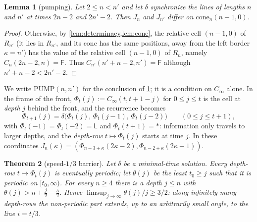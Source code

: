 \documentclass[3p]{elsarticle}
\newtheorem{theorem}{Theorem}[section]
\newtheorem{lemma}[theorem]{Lemma}
\theoremstyle{definition}
\newcommand{\Lq}{\mathsf L}
\newcommand{\Fq}{\mathsf F}
\begin{document}
\begin{lemma}[pumping]\label{lem:pumping}
Let $2\le n<n'$ and let $\delta$ synchronize the lines of lengths $n$ and $n'$
at times $2n-2$ and $2n'-2$. Then $J_n$ and $J_{n'}$ differ on
$\mathrm{cone}_n(n-1,0)$.
\end{lemma}

\begin{proof}
Otherwise, by \cref{lem:determinacy,lem:cone}, the relative cell $(n-1,0)$ of
$R_{n'}$ (it lies in $R_{n'}$, and its cone has the same positions, away from
the left border $\kappa=n'$) has the value of the relative cell $(n-1,0)$ of
$R_n$, namely $C_n(2n-2,n)=\Fq$. Thus $C_{n'}(n'+n-2,n')=\Fq$ although
$n'+n-2<2n'-2$.
\end{proof}

We write $\mathrm{PUMP}(n,n')$ for the conclusion of \cref{lem:pumping}; it is
a condition on $C_\infty$ alone. In the frame of the front,
$\Phi_t(j):=C_\infty(t,t+1-j)$ for $0\le j\le t$ is the cell at \emph{depth}
$j$ behind the front, and the recurrence becomes
\begin{equation}\label{eq:comoving}
\Phi_{t+1}(j)=\delta\bigl(\Phi_t(j),\,\Phi_t(j-1),\,\Phi_t(j-2)\bigr)
\qquad(0\le j\le t+1),
\end{equation}
with $\Phi_t(-1)=\Phi_t(-2)=\Lq$ and $\Phi_t(t+1)=\ast$: information only
travels to larger depths, and the \emph{depth-row} $t\mapsto\Phi_t(j)$ starts
at time $j$. In these coordinates
$J_n(\kappa)=(\Phi_{n-3+\kappa}(2\kappa-2),\Phi_{n-2+\kappa}(2\kappa-1))$.

\begin{theorem}[speed-$1/3$ barrier]\label{thm:third}
Let $\delta$ be a minimal-time solution. Every depth-row $t\mapsto\Phi_t(j)$ is
eventually periodic; let $\theta(j)$ be the least $t_0\ge j$ such that it is
periodic on $[t_0,\infty)$. For every $n\ge4$ there is a depth $j\le n$ with
$\theta(j)>n+\tfrac{j}{2}-\tfrac52$. Hence
$\limsup_{j\to\infty}\theta(j)/j\ge 3/2$: along infinitely many depth-rows the
non-periodic part extends, up to an arbitrarily small angle, to the line
$i=t/3$.
\end{theorem}
\end{document}
